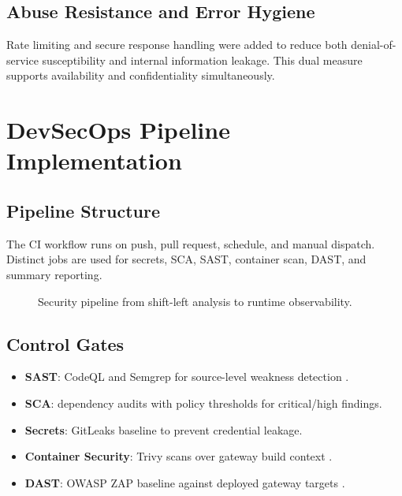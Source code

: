 \documentclass[conference]{IEEEtran}
\begin{document}
\subsection{Abuse Resistance and Error Hygiene}
Rate limiting and secure response handling were added to reduce both denial-of-service susceptibility and internal information leakage. This dual measure supports availability and confidentiality simultaneously.

\section{DevSecOps Pipeline Implementation}
\subsection{Pipeline Structure}
The CI workflow runs on push, pull request, schedule, and manual dispatch. Distinct jobs are used for secrets, SCA, SAST, container scan, DAST, and summary reporting.

\begin{figure}[!t]
\centering
{}
\caption{Security pipeline from shift-left analysis to runtime observability.}
\label{fig:pipeline}
\end{figure}

\subsection{Control Gates}
\begin{itemize}
\item \textbf{SAST}: CodeQL and Semgrep for source-level weakness detection \cite{codeql,semgrep}.
\item \textbf{SCA}: dependency audits with policy thresholds for critical/high findings.
\item \textbf{Secrets}: GitLeaks baseline to prevent credential leakage.
\item \textbf{Container Security}: Trivy scans over gateway build context \cite{trivy}.
\item \textbf{DAST}: OWASP ZAP baseline against deployed gateway targets \cite{zap}.
\end{itemize}
\end{document}
